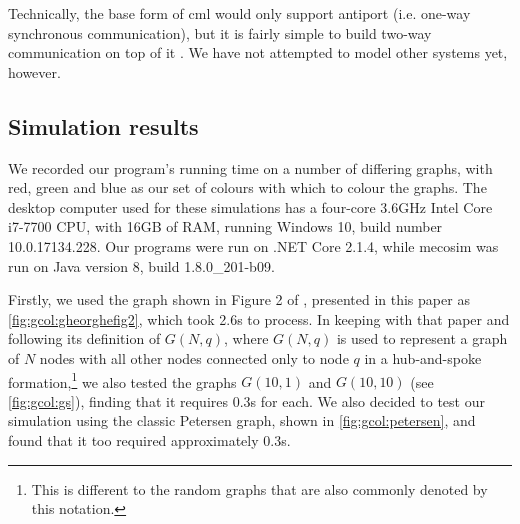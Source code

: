 Technically, the base form of \gls{cml} would only support antiport (i.e. one-way synchronous communication), but it is fairly simple to build two-way communication on top of it \cite[ch.~6]{Reppy2007}.  We have not attempted to model other systems yet, however.

\subsection{Simulation results}
We recorded our program's running time on a number of differing graphs, with red, green and blue as our set of colours with which to colour the graphs.  The desktop computer used for these simulations has a four-core 3.6GHz Intel Core i7-7700 CPU, with 16GB of RAM, running Windows 10, build number 10.0.17134.228.  Our \fsharp{} programs were run on .NET Core 2.1.4, while \gls{mecosim} was run on Java version 8, build 1.8.0\_201-b09. 


Firstly, we used the graph shown in Figure 2 of \cite{Gheorghe2013}, presented in this paper as \cref{fig:gcol:gheorghefig2}, which took 2.6s to process.  In keeping with that paper and following its definition of \(G(N,q)\), where \(G(N,q)\) is used to represent a graph of \(N\) nodes with all other nodes connected only to node \(q\) in a hub-and-spoke formation,\footnote{This is different to the random graphs that are also commonly denoted by this notation.} we also tested the graphs \(G(10,1)\) and \(G(10,10)\) (see \cref{fig:gcol:gs}), finding that it requires 0.3s for each.  We also decided to test our simulation using the classic Petersen graph, shown in \cref{fig:gcol:petersen}, and found that it too required approximately 0.3s.

